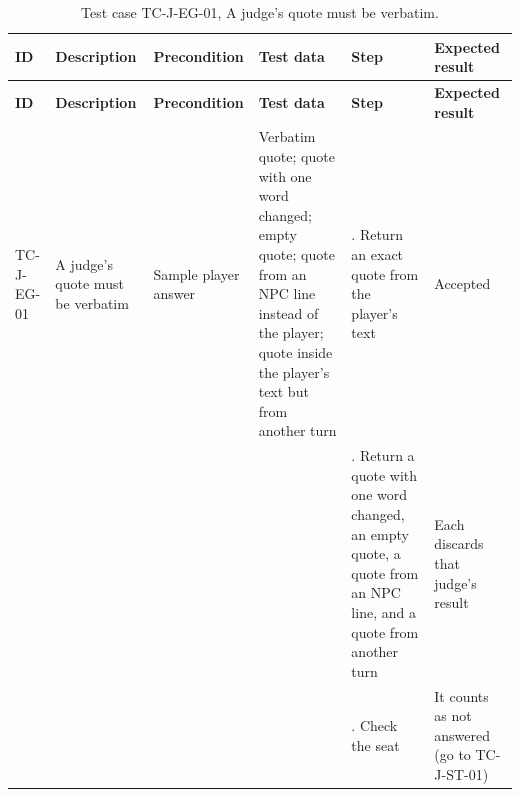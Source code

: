 {\footnotesize{}\renewcommand{\arraystretch}{1.1}
\begin{longtable}{|>{\raggedright\arraybackslash}p{}|>{\raggedright\arraybackslash}p{}|>{\raggedright\arraybackslash}p{}|>{\raggedright\arraybackslash}p{}|>{\raggedright\arraybackslash}p{}|>{\raggedright\arraybackslash}p{}|}
\caption{Test case TC-J-EG-01, A judge's quote must be verbatim.} \\
\hline
\textbf{ID} & \textbf{Description} & \textbf{Precondition} & \textbf{Test data} & \textbf{Step} & \textbf{Expected result} \\ \hline
\endfirsthead
\hline
\textbf{ID} & \textbf{Description} & \textbf{Precondition} & \textbf{Test data} & \textbf{Step} & \textbf{Expected result} \\ \hline
\endhead
TC-J-EG-01 & A judge's quote must be verbatim & Sample player answer & Verbatim quote; quote with one word changed; empty quote; quote from an NPC line instead of the player; quote inside the player's text but from another turn & 1. Return an exact quote from the player's text & Accepted \\ \cline{5-6}
 &  &  &  & 2. Return a quote with one word changed, an empty quote, a quote from an NPC line, and a quote from another turn & Each discards that judge's result \\ \cline{5-6}
 &  &  &  & 3. Check the seat & It counts as not answered (go to TC-J-ST-01) \\ \hline
\end{longtable}
}

